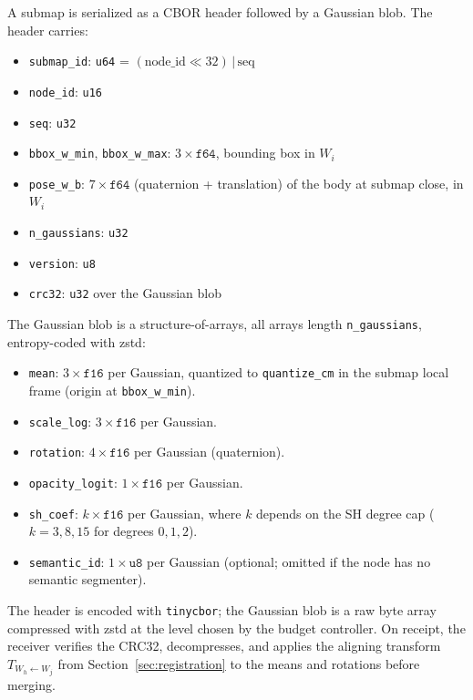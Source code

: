 \label{app:submap}

A submap is serialized as a CBOR header followed by a Gaussian blob. The
header carries:

\begin{itemize}
  \item \texttt{submap\_id}: \texttt{u64} = $(\text{node\_id} \ll 32) \,|\, \text{seq}$
  \item \texttt{node\_id}: \texttt{u16}
  \item \texttt{seq}: \texttt{u32}
  \item \texttt{bbox\_w\_min}, \texttt{bbox\_w\_max}: $3 \times \texttt{f64}$, bounding box in $W_i$
  \item \texttt{pose\_w\_b}: $7 \times \texttt{f64}$ (quaternion + translation) of the body at submap close, in $W_i$
  \item \texttt{n\_gaussians}: \texttt{u32}
  \item \texttt{version}: \texttt{u8}
  \item \texttt{crc32}: \texttt{u32} over the Gaussian blob
\end{itemize}

The Gaussian blob is a structure-of-arrays, all arrays length
\texttt{n\_gaussians}, entropy-coded with zstd:

\begin{itemize}
  \item \texttt{mean}: $3 \times \texttt{f16}$ per Gaussian, quantized to
    \texttt{quantize\_cm} in the submap local frame (origin at
    \texttt{bbox\_w\_min}).
  \item \texttt{scale\_log}: $3 \times \texttt{f16}$ per Gaussian.
  \item \texttt{rotation}: $4 \times \texttt{f16}$ per Gaussian (quaternion).
  \item \texttt{opacity\_logit}: $1 \times \texttt{f16}$ per Gaussian.
  \item \texttt{sh\_coef}: $k \times \texttt{f16}$ per Gaussian, where $k$
    depends on the SH degree cap ($k = 3, 8, 15$ for degrees $0,1,2$).
  \item \texttt{semantic\_id}: $1 \times \texttt{u8}$ per Gaussian (optional;
    omitted if the node has no semantic segmenter).
\end{itemize}

The header is encoded with \texttt{tinycbor}; the Gaussian blob is a raw
byte array compressed with zstd at the level chosen by the budget controller.
On receipt, the receiver verifies the CRC32, decompresses, and applies the
aligning transform $T_{W_h \leftarrow W_j}$ from
Section~\ref{sec:registration} to the means and rotations before merging.
